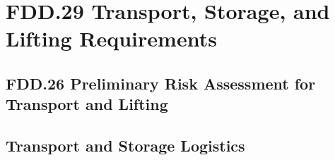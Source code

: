 \section{FDD.29 Transport, Storage, and Lifting Requirements}
\subsection{FDD.26 Preliminary Risk Assessment for Transport and Lifting}
\subsection{Transport and Storage Logistics}

\newpage